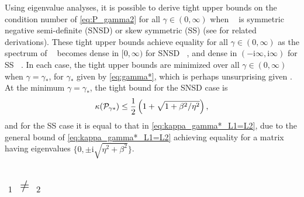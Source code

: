 \documentclass[review]{siamart}
\newcommand{\tcb}{\textcolor{blue}}
\DeclareMathOperator{\cL}{\widehat{\mathcal{L}}}
\begin{document}
%
\begin{remark}
Using eigenvalue analyses, it is possible to derive tight upper bounds on the
condition number of \eqref{eq:P_gamma2} for all $\gamma \in (0, \infty)$ when
$\cL$ is symmetric negative semi-definite (SNSD) or skew symmetric (SS)
(see \cite{exh} for related derivations).
These tight upper bounds achieve equality for all $\gamma \in (0,
\infty)$ as the spectrum of $\cL$ becomes dense in $[0, \infty)$ for SNSD
$\cL$, and dense in $(- \mathrm{i} \infty, \mathrm{i} \infty)$ for SS $\cL$. In each
case, the tight upper bounds are minimized over all $\gamma \in (0, \infty)$
when $\gamma = \gamma_*$, for $\gamma_*$ given by \eqref{eq:gamma*}, which is
perhaps unsurprising given . At the minimum $\gamma =
\gamma_*$, the tight bound for the SNSD case is
\begin{align*}
\kappa({\cal P}_{\gamma*}) \leq \frac{1}{2} \left( 1 + \sqrt{1 + \beta^2/\eta^2} \right),
\end{align*}
and for the SS case it is equal to that in \eqref{eq:kappa_gamma*_L1=L2}, due
to the general bound  of \eqref{eq:kappa_gamma*_L1=L2} achieving equality for a
matrix $\cL$ having eigenvalues $\{0, \pm \mathrm{i} \sqrt{\eta^2 + \beta^2} \}$.
\end{remark}


\subsection{$\cL_1 \neq \cL_2$}\label{sec:theory:gen}
\end{document}
